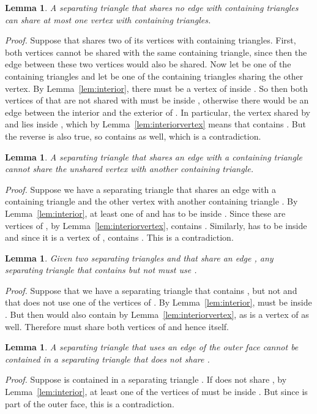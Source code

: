 \pdfoutput=1 \documentclass[12pt]{elsarticle}
\newtheorem{lem}[defin]{Lemma}
\newenvironment{lemma}{\begin{lem} \sl}{\end{lem}}
\newenvironment{proof}{\emph{Proof.}}{\hfill  \medskip\\}
\begin{document}
\vspace{-0.5em}
\begin{lemma}
 \label{lem:onecontaining}
 A separating triangle  that shares no edge with containing triangles can share at most one vertex with containing triangles.
\end{lemma}
\begin{proof}
 Suppose that  shares two of its vertices with containing triangles. First, both vertices cannot be shared with the same containing triangle, since then the edge between these two vertices would also be shared. Now let  be one of the containing triangles and let  be one of the containing triangles sharing the other vertex. By Lemma~\ref{lem:interior}, there must be a vertex of  inside . So then both vertices of  that are not shared with  must be inside , otherwise there would be an edge between the interior and the exterior of . In particular, the vertex shared by  and  lies inside , which by Lemma~\ref{lem:interiorvertex} means that  contains . But the reverse is also true, so  contains  as well, which is a contradiction.
\end{proof}
\vspace{-0.5em}
\begin{lemma}
 \label{lem:unsharedvertex}
 A separating triangle that shares an edge with a containing triangle cannot share the unshared vertex with another containing triangle.
\end{lemma}
\begin{proof}
 Suppose we have a separating triangle  that shares an edge  with a containing triangle  and the other vertex  with another containing triangle . By Lemma~\ref{lem:interior}, at least one of  and  has to be inside . Since these are vertices of , by Lemma~\ref{lem:interiorvertex},  contains . Similarly,  has to be inside  and since it is a vertex of ,  contains . This is a contradiction.
\end{proof}
\vspace{-0.5em}
\begin{lemma}
 \label{lem:containingshared}
 Given two separating triangles  and  that share an edge , any separating triangle that contains  but not  must use .
\end{lemma}
\begin{proof}
 Suppose that we have a separating triangle  that contains , but not  and that does not use one of the vertices  of . By Lemma~\ref{lem:interior},  must be inside . But then  would also contain  by Lemma~\ref{lem:interiorvertex}, as  is a vertex of  as well. Therefore  must share both vertices of  and hence  itself.
\end{proof}
\vspace{-0.5em}
\begin{lemma}
 \label{lem:outertriangle}
 A separating triangle  that uses an edge  of the outer face cannot be contained in a separating triangle that does not share .
\end{lemma}
\begin{proof}
 Suppose  is contained in a separating triangle . If  does not share , by Lemma~\ref{lem:interior}, at least one of the vertices of  must be inside . But since  is part of the outer face, this is a contradiction.
\end{proof}
\end{document}
